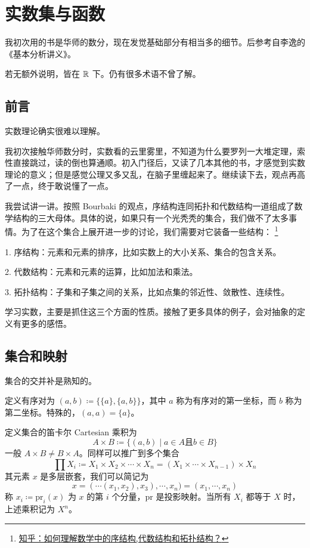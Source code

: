 
\chapter{实数集与函数}

我初次用的书是华师的数分，现在发觉基础部分有相当多的细节。后参考自李逸的《基本分析讲义》。

若无额外说明，皆在 $\mathbb{R}$ 下。仍有很多术语不曾了解。

\section{前言}

实数理论确实很难以理解。

我初次接触华师数分时，实数看的云里雾里，不知道为什么要罗列一大堆定理，索性直接跳过，读的倒也算通顺。初入门径后，又读了几本其他的书，才感觉到实数理论的意义；但是感觉公理又多又乱，在脑子里缠起来了。继续读下去，观点再高了一点，终于敢说懂了一点。

我尝试讲一讲。按照 Bourbaki 的观点，序结构连同拓扑和代数结构一道组成了数学结构的三大母体。具体的说，如果只有一个光秃秃的集合，我们做不了太多事情。为了在这个集合上展开进一步的讨论，我们需要对它装备一些结构：
\footnote{\href{https://www.zhihu.com/question/47999353/answer/1012530744}{知乎：如何理解数学中的序结构,代数结构和拓扑结构？}}

1. 序结构：元素和元素的排序，比如实数上的大小关系、集合的包含关系。

2. 代数结构：元素和元素的运算，比如加法和乘法。

3. 拓扑结构：子集和子集之间的关系，比如点集的邻近性、敛散性、连续性。

学习实数，主要是抓住这三个方面的性质。接触了更多具体的例子，会对抽象的定义有更多的感悟。

\section{集合和映射}

集合的交并补是熟知的。

定义有序对为 $(a,b) \coloneqq  \{\{a\},\{a,b\}\}$，其中 $a$ 称为有序对的第一坐标，而 $b$ 称为第二坐标。特殊的，$(a,a) = \{a\}$。

定义集合的笛卡尔 Cartesian 乘积为
$$A \times B \coloneqq  \{(a,b) \mid a\in A \text{且} b\in B\}$$
一般 $A \times B \ne B \times A$。同样可以推广到多个集合
$$\prod X_i \coloneqq  X_1 \times X_2 \times \cdots \times X_n = (X_1 \times \cdots \times X_{n-1}) \times X_n$$
其元素 $x$ 是多层嵌套，我们可以简记为
$$x = (\cdots(x_1,x_2),x_3),\cdots,x_n) = (x_1,\cdots,x_n)$$
称 $x_i \coloneqq  \mathrm{pr}_i(x)$ 为 $x$ 的第 $i$ 个分量，$\mathrm{pr}$ 是投影映射。当所有 $X_i$ 都等于 $X$ 时，上述乘积记为 $X^n$。


